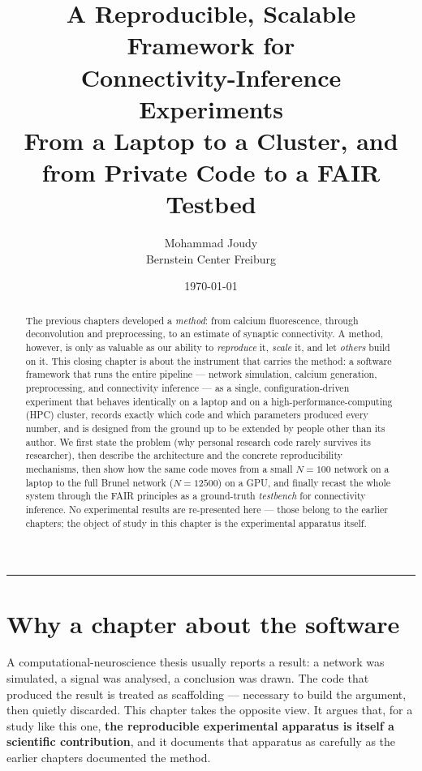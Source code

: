 \documentclass[11pt,a4paper]{article}
\title{\textbf{A Reproducible, Scalable Framework for\\ Connectivity-Inference Experiments}\\[4pt]
\large From a Laptop to a Cluster, and from Private Code to a FAIR Testbed}
\author{Mohammad Joudy \\ \small Bernstein Center Freiburg}
\date{\today}
\begin{document}
\maketitle

\begin{abstract}
\noindent
The previous chapters developed a \emph{method}: from calcium fluorescence, through
deconvolution and preprocessing, to an estimate of synaptic connectivity. A method,
however, is only as valuable as our ability to \emph{reproduce} it, \emph{scale} it, and
let \emph{others} build on it. This closing chapter is about the instrument that carries
the method: a software framework that runs the entire pipeline --- network simulation,
calcium generation, preprocessing, and connectivity inference --- as a single,
configuration-driven experiment that behaves identically on a laptop and on a
high-performance-computing (HPC) cluster, records exactly which code and which parameters
produced every number, and is designed from the ground up to be extended by people other
than its author. We first state the problem (why personal research code rarely survives its
researcher), then describe the architecture and the concrete reproducibility mechanisms,
then show how the same code moves from a small $N=100$ network on a laptop to the full
Brunel network ($N=12500$) on a GPU, and finally recast the whole system through the FAIR
principles \cite{wilkinson2016} as a ground-truth \emph{testbench} for connectivity
inference. No experimental results are re-presented here --- those belong to the earlier
chapters; the object of study in this chapter is the experimental apparatus itself.
\end{abstract}

\tableofcontents
\vspace{1em}
\hrule
\vspace{1em}

\section{Why a chapter about the software}
\label{sec:why}

A computational-neuroscience thesis usually reports a result: a network was simulated, a
signal was analysed, a conclusion was drawn. The code that produced the result is treated as
scaffolding --- necessary to build the argument, then quietly discarded. This chapter takes
the opposite view. It argues that, for a study like this one, \textbf{the reproducible
experimental apparatus is itself a scientific contribution}, and it documents that apparatus
as carefully as the earlier chapters documented the method.
\end{document}
